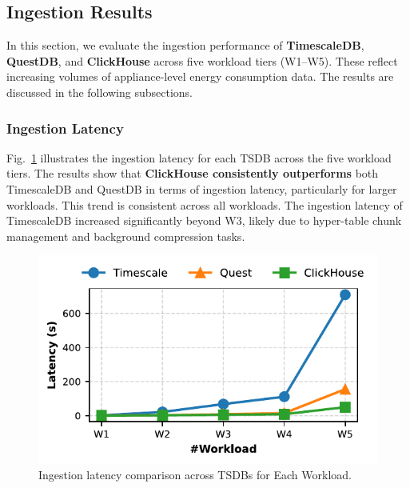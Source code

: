 \documentclass[conference]{IEEEtran}
\begin{document}
\subsection{Ingestion Results}
In this section, we evaluate the ingestion performance of \textbf{TimescaleDB}, \textbf{QuestDB}, and \textbf{ClickHouse} across five workload tiers (W1--W5). These reflect increasing volumes of appliance-level energy consumption data. The results are discussed in the following subsections.

\subsubsection{Ingestion Latency}
Fig.~\ref{fig:ingestion_latency_comparison} illustrates the ingestion latency for each TSDB across the five workload tiers. The results show that \textbf{ClickHouse consistently outperforms} both TimescaleDB and QuestDB in terms of ingestion latency, particularly for larger workloads. This trend is consistent across all workloads. The ingestion latency of TimescaleDB increased significantly beyond W3, likely due to hyper-table chunk management and background compression tasks.
\begin{figure}[tb]
\centering
\includegraphics[width=0.9\linewidth]{1_ing_latency_plot.pdf}
\caption{Ingestion latency comparison across TSDBs for Each Workload.}
\label{fig:ingestion_latency_comparison}
\end{figure}
\end{document}
